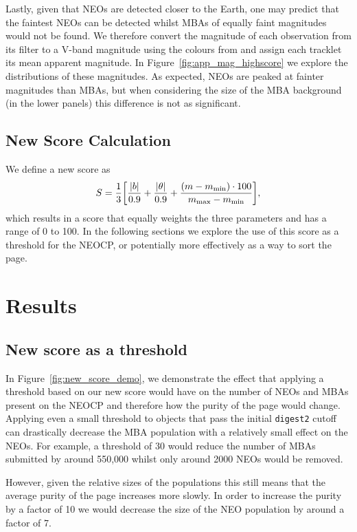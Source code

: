 \documentclass[twocolumn, twocolappendix]{aastex631}
\newcommand{\dig}{\texttt{digest2}}
\begin{document}
Lastly, given that NEOs are detected closer to the Earth, one may predict that the faintest NEOs can be detected whilst MBAs of equally faint magnitudes would not be found. We therefore convert the magnitude of each observation from its filter to a V-band magnitude using the colours from \citet{Jones+2018} and assign each tracklet its mean apparent magnitude. In Figure~\ref{fig:app_mag_highscore} we explore the distributions of these magnitudes. As expected, NEOs are peaked at fainter magnitudes than MBAs, but when considering the size of the MBA background (in the lower panels) this difference is not as significant.

\subsection{New Score Calculation}
We define a new score as
\begin{equation}
    S = \frac{1}{3} \qty[\frac{|b|}{0.9} + \frac{|\theta|}{0.9} + \frac{(m - m_{\rm min}) \cdot 100}{m_{\rm max} - m_{\rm min}}],
\end{equation}
which results in a score that equally weights the three parameters and has a range of 0 to 100. In the following sections we explore the use of this score as a threshold for the NEOCP, or potentially more effectively as a way to sort the page.

\section{Results}

\subsection{New score as a threshold}

In Figure~\ref{fig:new_score_demo}, we demonstrate the effect that applying a threshold based on our new score would have on the number of NEOs and MBAs present on the NEOCP and therefore how the purity of the page would change. Applying even a small threshold to objects that pass the initial \dig{} cutoff can drastically decrease the MBA population with a relatively small effect on the NEOs. For example, a threshold of 30 would reduce the number of MBAs submitted by around 550,000 whilst only around 2000 NEOs would be removed.

However, given the relative sizes of the populations this still means that the average purity of the page increases more slowly. In order to increase the purity by a factor of 10 we would decrease the size of the NEO population by around a factor of 7.
\end{document}
